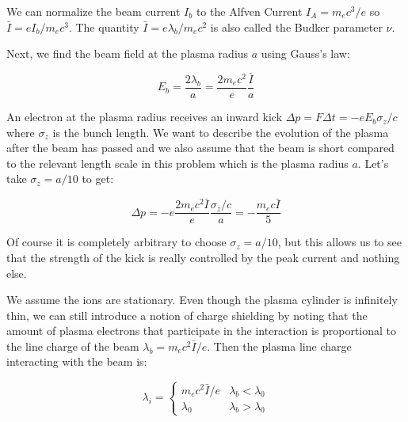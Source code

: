 \documentclass[aps,prl,preprint,groupedaddress]{revtex4-1}
\begin{document}
We can normalize the beam current $I_b$ to the Alfven Current $I_A = m_e c^3/e$ so $\bar{I} = e I_b /m_e c^3$. The quantity $\bar{I} = e \lambda_b/m_e c^2$ is also called the Budker parameter $\nu$. 

Next, we find the beam field at the plasma radius $a$ using Gauss's law:

\begin{equation}\label{eq:E_beam}
E_b = \frac{2 \lambda_b}{a} = \frac{2m_e c^2}{e} \frac{\bar{I}}{a}
\end{equation}

An electron at the plasma radius receives an inward kick $\Delta p = F \Delta t = -e E_b \sigma_z/c$ where $\sigma_z$ is the bunch length. We want to describe the evolution of the plasma after the beam has passed and we also assume that the beam is short compared to the relevant length scale in this problem which is the plasma radius $a$. Let's take $\sigma_z = a/10$ to get:

\begin{equation}\label{eq:norm_kick}
\Delta p = -e \frac{2m_e c^2 \bar{I}}{e}\frac{\sigma_z/c}{a} = -\frac{m_e c \bar{I}}{5}
\end{equation}  

Of course it is completely arbitrary to choose $\sigma_z = a/10$, but this allows us to see that the strength of the kick is really controlled by the peak current and nothing else. 


We assume the ions are stationary. Even though the plasma cylinder is infinitely thin, we can still introduce a notion of charge shielding by noting that the amount of plasma electrons that participate in the interaction is proportional to the line charge of the beam $\lambda_b = m_e c^2 \bar{I}/e$. Then the plasma line charge interacting with the beam is:

\begin{equation}\label{eq:part_charge}
\lambda_i = \left\{ \begin{array}{lr}
m_e c^2 \bar{I}/e & \lambda_b < \lambda_0 \\
\lambda_0 & \lambda_b > \lambda_0
\end{array} \right.
\end{equation}
\end{document}
